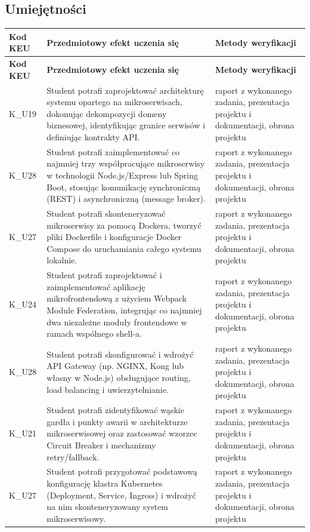 \documentclass[12pt, a4paper]{article}
\newcommand{\thdrule}{\noalign{\global\setlength{\extrarowheight}{0pt}}}
\newcommand{\thdend}{\noalign{\global\setlength{\extrarowheight}{3pt}}}
\begin{document}
\subsection*{Umiejętności}
{\scriptsize
\begin{longtable}{m{1.6cm}m{9.0cm}m{4.2cm}}
\thdrule\toprule
\rowcolor{pjatkRed} {\color{white}\footnotesize\textbf{\vphantom{Ag}Kod KEU}} & {\color{white}\footnotesize\textbf{\vphantom{Ag}Przedmiotowy efekt uczenia się}} & {\color{white}\footnotesize\textbf{\vphantom{Ag}Metody weryfikacji}} \\
\midrule\thdend
\endfirsthead
\thdrule\toprule
\rowcolor{pjatkRed} {\color{white}\footnotesize\textbf{\vphantom{Ag}Kod KEU}} & {\color{white}\footnotesize\textbf{\vphantom{Ag}Przedmiotowy efekt uczenia się}} & {\color{white}\footnotesize\textbf{\vphantom{Ag}Metody weryfikacji}} \\
\midrule\thdend
\endhead
  \rowcolor{tableRowLight} K\_U19 & Student potrafi zaprojektować architekturę systemu opartego na mikroserwisach, dokonując dekompozycji domeny biznesowej, identyfikując granice serwisów i definiując kontrakty API. & raport z wykonanego zadania, prezentacja projektu i dokumentacji, obrona projektu \\
  \rowcolor{tableRowAlt} K\_U28 & Student potrafi zaimplementować co najmniej trzy współpracujące mikroserwisy w technologii Node.js/Express lub Spring Boot, stosując komunikację synchroniczną (REST) i asynchroniczną (message broker). & raport z wykonanego zadania, prezentacja projektu i dokumentacji, obrona projektu \\
  \rowcolor{tableRowLight} K\_U27 & Student potrafi skonteneryzować mikroserwisy za pomocą Dockera, tworzyć pliki Dockerfile i konfiguracje Docker Compose do uruchamiania całego systemu lokalnie. & raport z wykonanego zadania, prezentacja projektu i dokumentacji, obrona projektu \\
  \rowcolor{tableRowAlt} K\_U24 & Student potrafi zaprojektować i zaimplementować aplikację mikrofrontendową z użyciem Webpack Module Federation, integrując co najmniej dwa niezależne moduły frontendowe w ramach wspólnego shell-a. & raport z wykonanego zadania, prezentacja projektu i dokumentacji, obrona projektu \\
  \rowcolor{tableRowLight} K\_U28 & Student potrafi skonfigurować i wdrożyć API Gateway (np. NGINX, Kong lub własny w Node.js) obsługujące routing, load balancing i uwierzytelnianie. & raport z wykonanego zadania, prezentacja projektu i dokumentacji, obrona projektu \\
  \rowcolor{tableRowAlt} K\_U21 & Student potrafi zidentyfikować wąskie gardła i punkty awarii w architekturze mikroserwisowej oraz zastosować wzorzec Circuit Breaker i mechanizmy retry/fallback. & raport z wykonanego zadania, prezentacja projektu i dokumentacji, obrona projektu \\
  \rowcolor{tableRowLight} K\_U27 & Student potrafi przygotować podstawową konfigurację klastra Kubernetes (Deployment, Service, Ingress) i wdrożyć na nim skonteneryzowany system mikroserwisowy. & raport z wykonanego zadania, prezentacja projektu i dokumentacji, obrona projektu \\
\bottomrule
\end{longtable}}
\end{document}
